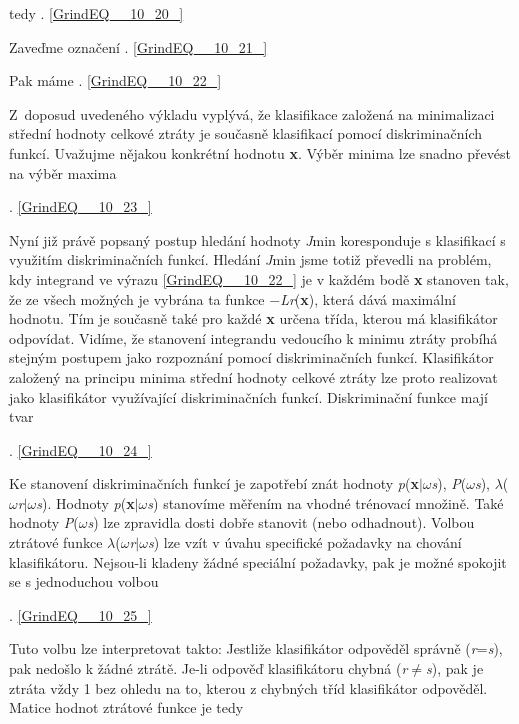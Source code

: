 \noindent tedy . \eqref{GrindEQ__10_20_}

\noindent Zaveďme označení . \eqref{GrindEQ__10_21_}

\noindent Pak máme . \eqref{GrindEQ__10_22_}

\noindent Z~doposud uvedeného výkladu vyplývá, že klasifikace založená na minimalizaci střední hodnoty celkové ztráty je současně klasifikací pomocí diskriminačních funkcí. Uvažujme nějakou konkrétní hodnotu \textbf{x}. Výběr minima lze snadno převést na výběr maxima

 . \eqref{GrindEQ__10_23_}

\noindent Nyní již právě popsaný postup hledání hodnoty \textit{J}min koresponduje s klasifikací s využitím diskriminačních funkcí. Hledání \textit{J}min jsme totiž převedli na problém, kdy integrand ve výrazu \eqref{GrindEQ__10_22_} je v každém bodě \textbf{x} stanoven tak, že ze všech možných je vybrána ta funkce $-$\textit{Lr}(\textbf{x}), která dává maximální hodnotu. Tím je současně také pro každé \textbf{x} určena třída, kterou má klasifikátor odpovídat. Vidíme, že stanovení integrandu vedoucího k minimu ztráty probíhá stejným postupem jako rozpoznání pomocí diskriminačních funkcí. Klasifikátor založený na principu minima střední hodnoty celkové ztráty lze proto realizovat jako klasifikátor využívající diskriminačních funkcí. Diskriminační funkce mají tvar 

 . \eqref{GrindEQ__10_24_}

\noindent Ke stanovení diskriminačních funkcí je zapotřebí znát hodnoty \textit{p}(\textbf{x}$\mid$$\omega$\textit{s}), \textit{P}($\omega$\textit{s}), $\lambda$($\omega$\textit{r}$\mid$$\omega$\textit{s}). Hodnoty  \textit{p}(\textbf{x}$\mid$$\omega$\textit{s}) stanovíme měřením na vhodné trénovací množině. Také  hodnoty \textit{P}($\omega$\textit{s}) lze zpravidla dosti dobře stanovit (nebo odhadnout). Volbou ztrátové funkce $\lambda$($\omega$\textit{r}$\mid$$\omega$\textit{s}) lze vzít v úvahu specifické požadavky na chování klasifikátoru. Nejsou-li kladeny žádné speciální požadavky, pak je možné spokojit se s jednoduchou volbou

 . \eqref{GrindEQ__10_25_}

\noindent Tuto volbu lze interpretovat takto: Jestliže klasifikátor odpověděl správně (\textit{r}=\textit{s}), pak nedošlo k žádné ztrátě. Je-li odpověď klasifikátoru chybná (\textit{r}$\neq$\textit{s}), pak je ztráta vždy 1 bez ohledu na to, kterou z chybných tříd klasifikátor odpověděl. Matice hodnot ztrátové funkce je tedy  

